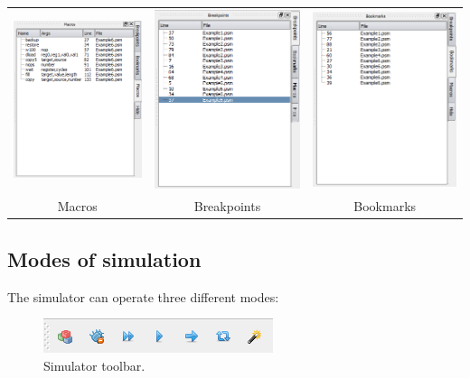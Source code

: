         \begin{table}[h!]
            \begin{tabular}{ccc}
                \includegraphics[width=.3\textwidth]{img/listmacros.png}
                    &
                \includegraphics[width=.3\textwidth]{img/listbreakpoints.png}
                    &
                \includegraphics[width=.3\textwidth]{img/listbookmarks.png}
                \\ Macros & Breakpoints & Bookmarks
            \end{tabular}
        \end{table}


    \subsection{Modes of simulation}
        The simulator can operate three different modes:

        \begin{figure}[h!]
            \centering{}
            \includegraphics[width=.4\textwidth]{img/simulation_panel.png}
            \caption{Simulator toolbar.}
        \end{figure}

